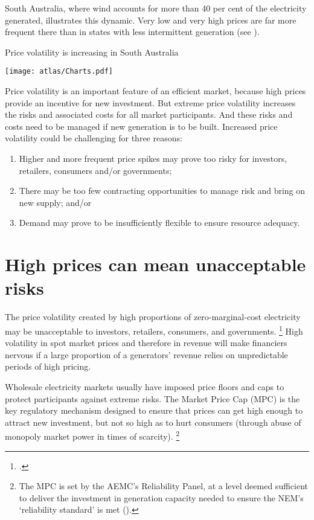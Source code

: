 \documentclass[FrontPage]{grattan}
\begin{document}
South Australia, where wind accounts for more than 40 per cent of the electricity generated, illustrates this dynamic. Very low and very high prices are far more frequent there than in states with less intermittent generation (see ).

\begin{figureTop}
\caption{Price volatility is increasing in South Australia}\label{fig:price-volatility-is-increasing-in-South-Australia}
\texttt{[image: atlas/Charts.pdf]}
\end{figureTop}

Price volatility is an important feature of an efficient market, because high prices provide an incentive for new investment. But extreme price volatility increases the risks and associated costs for all market participants. And these risks and costs need to be managed if new generation is to be built. Increased price volatility could be challenging for three reasons:
\begin{enumerate}
    \item Higher and more frequent price spikes may prove too risky for investors, retailers, consumers and/or governments;
    \item There may be too few contracting opportunities to manage risk and bring on new supply; and/or
    \item Demand may prove to be insufficiently flexible to ensure resource adequacy.
\end{enumerate}

\section{High prices can mean unacceptable risks}\label{sec:high-prices-mean-unacceptable-risks}
The price volatility created by high proportions of zero-marginal-cost electricity may be unacceptable to investors, retailers, consumers, and governments.%
\footcites{Nelson2016NewNEM}{AESO2016AlbertaMarketReform}
High volatility in spot market prices and therefore in revenue will make financiers nervous if a large proportion of a generators' revenue relies on unpredictable periods of high pricing.

Wholesale electricity markets usually have imposed price floors and caps to protect participants against extreme risks. The Market Price Cap (MPC) is the key regulatory mechanism designed to ensure that prices can get high enough to attract new investment, but not so high as to hurt consumers (through abuse of monopoly market power in times of scarcity).%
\footnote{The MPC is set by the AEMC's Reliability Panel, at a level deemed sufficient to deliver the investment in generation capacity needed to ensure the NEM's `reliability standard' is met (\textcite{AEMC2017ReliabilityStandardReview}).}
\end{document}
